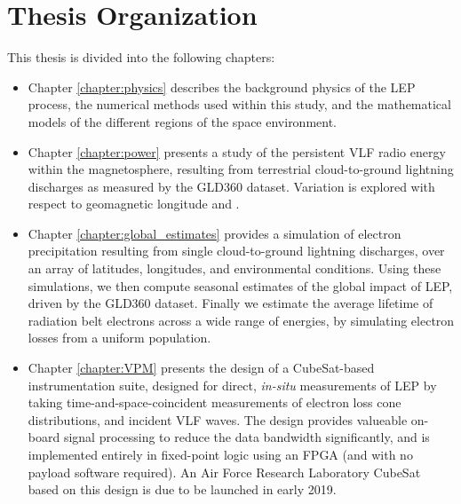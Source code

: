\section{Thesis Organization}
This thesis is divided into the following chapters:
\begin{itemize}
\item Chapter \ref{chapter:physics} describes the background physics of the LEP process, the numerical methods used within this study, and the mathematical models of the different regions of the space environment. 
\item Chapter \ref{chapter:power} presents a study of the persistent VLF radio energy within the magnetosphere, resulting from terrestrial cloud-to-ground lightning discharges as measured by the GLD360 dataset. Variation is explored with respect to geomagnetic longitude and \kp{}. 
\item Chapter \ref{chapter:global_estimates} provides a simulation of electron precipitation resulting from single cloud-to-ground lightning discharges, over an array of latitudes, longitudes, and environmental conditions. Using these simulations, we then compute seasonal estimates of the global impact of LEP, driven by the GLD360 dataset. Finally we estimate the average lifetime of radiation belt electrons across a wide range of energies, by simulating electron losses from a uniform population.

\item Chapter \ref{chapter:VPM} presents the design of a CubeSat-based instrumentation suite, designed for direct, \emph{in-situ} measurements of LEP by taking time-and-space-coincident measurements of electron loss cone distributions, and incident VLF waves. The design provides valueable on-board signal processing to reduce the data bandwidth significantly, and is implemented entirely in fixed-point logic using an FPGA (and with no payload software required). An Air Force Research Laboratory CubeSat based on this design is due to be launched in early 2019.
\end{itemize}

